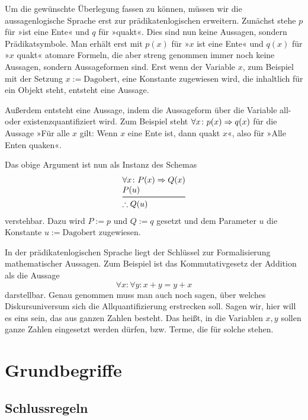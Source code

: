 Um die gewünschte Überlegung fassen zu können, müssen wir die
aussagenlogische Sprache erst zur prädikatenlogischen erweitern.
Zunächst stehe $p$ für »ist eine Ente« und $q$ für »quakt«. Dies sind
nun keine Aussagen, sondern Prädikatsymbole. Man erhält erst mit
$p(x)$ für »$x$ ist eine Ente« und $q(x)$ für »$x$ quakt« atomare
Formeln, die aber streng genommen immer noch keine Aussagen, sondern
Aussageformen sind. Erst wenn der Variable $x$, zum Beispiel mit der
Setzung $x:=\text{Dagobert}$, eine Konstante zugewiesen wird, die inhaltlich
für ein Objekt steht, entsteht eine Aussage.

Außerdem entsteht eine Aussage, indem die Aussageform über die Variable
all- oder existenzquantifiziert wird. Zum Beispiel
steht $\forall x\colon p(x)\Rightarrow q(x)$ für die Aussage »Für alle $x$
gilt: Wenn $x$ eine Ente ist, dann quakt $x$«, also für
»Alle Enten quaken«.

Das obige Argument ist nun als Instanz des Schemas
\[\begin{array}{@{}l@{}}
\forall x\colon P(x)\cond Q(x)\\
P(u)\\
\midrule[\inferrulewidth]
\therefore Q(u)
\end{array}\]
verstehbar. Dazu wird $P:=p$ und $Q:=q$ gesetzt und dem Parameter
$u$ die Konstante $u:=\text{Dagobert}$ zugewiesen.

In der prädikatenlogischen Sprache liegt der Schlüssel zur Formalisierung
mathematischer Aussagen. Zum Beispiel ist das Kommutativgesetz der
Addition als die Aussage
\[\forall x\colon\forall y\colon x+y=y+x\]
darstellbar. Genau genommen muss man auch noch sagen, über welches
Diskursuniversum sich die Allquantifizierung erstrecken soll. Sagen wir,
hier will es eins sein, das aus ganzen Zahlen besteht. Das heißt, in
die Variablen $x,y$ sollen ganze Zahlen eingesetzt werden dürfen,
bzw. Terme, die für solche stehen.

\section{Grundbegriffe}

\subsection{Schlussregeln}


